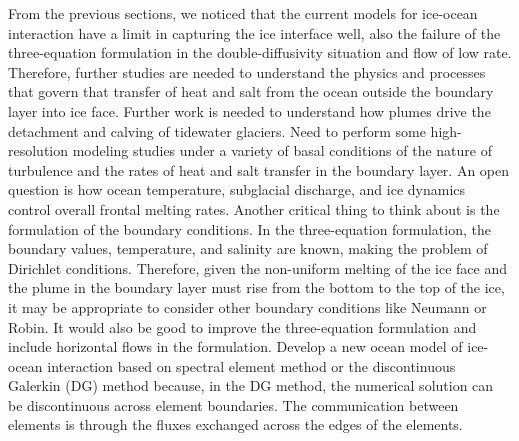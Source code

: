 \documentclass[11pt,a4paper]{article}
\begin{document}
    From the previous sections, we noticed that the current models for ice-ocean interaction have a limit in capturing the ice interface well, also the failure of the three-equation formulation in the double-diffusivity situation and flow of low rate. Therefore, further studies are needed to understand the physics and processes that govern that transfer of heat and salt from the ocean outside the boundary layer into ice face.
    Further work is needed to understand how plumes drive the detachment and calving of tidewater glaciers. Need to perform some  high-resolution modeling studies under a variety of basal conditions of the nature of turbulence and the rates of heat and salt transfer in the boundary layer. An open question is how ocean temperature, subglacial discharge, and ice dynamics control overall frontal melting rates. Another critical thing to think about is the formulation of the boundary conditions. In the three-equation formulation, the boundary values, temperature, and salinity are known, making the problem of Dirichlet conditions. Therefore, given the non-uniform melting of the ice face and the plume in the boundary layer must rise from the bottom to the top of the ice, it may be appropriate to consider other boundary conditions like Neumann or Robin. It would also be good to improve the three-equation formulation and include horizontal flows in the formulation. Develop a new ocean model of ice-ocean interaction based on spectral element method or the discontinuous Galerkin (DG) method because, in the DG method, the numerical solution can be discontinuous across element boundaries. The communication between elements is through the fluxes exchanged across the edges of the elements.


	

	
	
	
\end{document}
